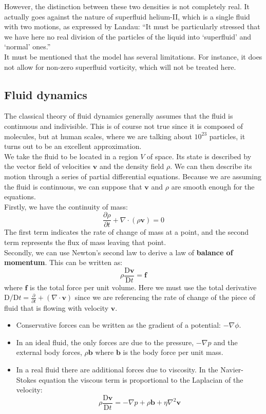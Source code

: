 \documentclass{article}
\begin{document}
However, the distinction between these two densities is not completely real. It actually goes against the nature of superfluid helium-II, which is a single fluid with two motions, as expressed by Landau: ``It must be particularly stressed that we
have here no real division of the particles of the liquid into `superfluid'
and `normal' ones.''
\\

It must be mentioned that the model has several limitations. For instance, it does not allow for non-zero superfluid vorticity, which will not be treated here.


\subsection{Fluid dynamics}
The classical theory of fluid dynamics generally assumes that the fluid is
continuous and indivisible.  This is of course not true since it is composed
of molecules, but at human scales, where we are talking about $10^{23}$
particles, it turns out to be an excellent approximation.
\\

We take the fluid to be located in a region $V$ of space.  Its state is
described by the vector field of velocities $\mathbf{v}$ and the density
field $\rho$.  We can then describe its motion through a series of partial
differential equations.  Because we are assuming the fluid is continuous, we
can suppose that $\mathbf{v}$ and $\rho$ are smooth enough for the equations.
\\

Firstly, we have the continuity of mass:
\[\frac{\partial\rho}{\partial t} + \nabla\cdot(\rho\mathbf{v}) = 0\]
The first term indicates the rate of change of mass at a point, and the second
term represents the flux of mass leaving that point.
\\

Secondly, we can use Newton's second law to derive a law of
\textbf{balance of momentum}.	This can be written as:
\[\rho\frac{\mathrm{D}\mathbf{v}}{\mathrm{D} t}= \mathbf{f}\]
where $\mathbf{f}$ is the total force per unit volume.	Here we must use the
total derivative
$\mathrm{D}/\mathrm{D}t = \frac{\partial}{\partial t} + (\nabla \cdot
    \mathbf{v})$
since we are referencing the rate of change of the piece of fluid that is
flowing with velocity $\mathbf{v}$.
\begin{itemize}
    \item Conservative forces can be written as the gradient of a potential: $-\nabla\phi$.
    \item In an ideal fluid, the only forces are due to the pressure, $-\nabla p$ and the external body forces, $\rho \mathbf{b}$ where $\mathbf{b}$ is the body force per unit mass.
    \item In a real fluid there are additional forces due to viscosity. In the Navier-Stokes equation the viscous term is proportional to the Laplacian of the velocity:
\[\rho\frac{\mathrm{D}\mathbf{v}}{\mathrm{D} t}=-\nabla p + \rho \mathbf{b} +
    \eta\nabla^2{\mathbf{v}}\]
\end{itemize}
\end{document}
